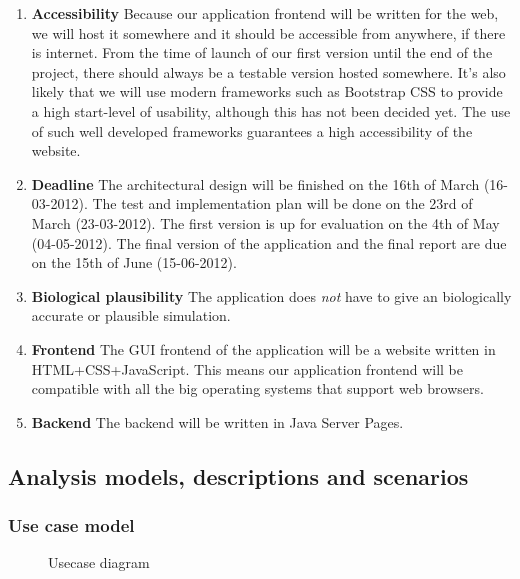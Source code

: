 \documentclass[a4paper]{article}
\begin{document}
\begin{enumerate}
\item \textbf{Accessibility} Because our application frontend will be written for the web, we will host it somewhere and it should be accessible from anywhere, if there is internet. From the time of launch of our first version until the end of the project, there should always be a testable version hosted somewhere. It's also likely that we will use modern frameworks such as Bootstrap CSS to provide a high start-level of usability, although this has not been decided yet. The use of such well developed frameworks guarantees a high accessibility of the website.

\item \textbf{Deadline} The architectural design will be finished on the 16th of March (16-03-2012). The test and implementation plan will be done on the 23rd of March (23-03-2012). The first version is up for evaluation on the 4th of May (04-05-2012). The final version of the application and the final report are due on the 15th of June (15-06-2012).
\item \textbf{Biological plausibility} The application does \textit{not} have to give an biologically accurate or plausible simulation.

\item \textbf{Frontend} The GUI frontend of the application will be a website written in HTML+CSS+JavaScript. This means our application frontend will be compatible with all the big operating systems that support web browsers.\item \textbf{Backend} The backend will be written in Java Server Pages.
 
\end{enumerate}
\pagebreak
\subsection{Analysis models, descriptions and scenarios}
\subsubsection{Use case model}
\begin{figure}[h!]
	\caption{Usecase diagram}
	\centering
\end{figure}
\end{document}
